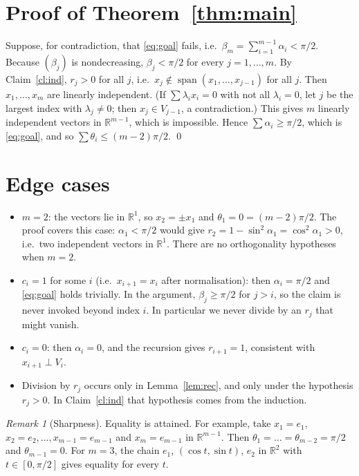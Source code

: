 \documentclass[11pt]{article}
\theoremstyle{remark}
\newtheorem{remark}[theorem]{Remark}
\theoremstyle{definition}
\begin{document}
\section{Proof of Theorem~\ref{thm:main}}

Suppose, for contradiction, that \eqref{eq:goal} fails, i.e.\ $\beta_m=\sum_{i=1}^{m-1}\alpha_i<\pi/2$.
Because $(\beta_j)$ is nondecreasing, $\beta_j<\pi/2$ for every $j=1,\dots,m$. By Claim~\ref{cl:ind},
$r_j>0$ for all $j$, i.e.\ $x_j\notin\operatorname{span}(x_1,\dots,x_{j-1})$ for all $j$. Then
$x_1,\dots,x_m$ are linearly independent. (If $\sum\lambda_ix_i=0$ with not all $\lambda_i=0$, let
$j$ be the largest index with $\lambda_j\ne0$; then $x_j\in V_{j-1}$, a contradiction.) This gives
$m$ linearly independent vectors in $\mathbb{R}^{m-1}$, which is impossible. Hence
$\sum\alpha_i\ge\pi/2$, which is \eqref{eq:goal}, and so $\sum\theta_i\le(m-2)\pi/2$. \qed

\section{Edge cases}

\begin{itemize}
\item $m=2$: the vectors lie in $\mathbb{R}^1$, so $x_2=\pm x_1$ and $\theta_1=0=(m-2)\pi/2$. The proof
  covers this case: $\alpha_1<\pi/2$ would give $r_2=1-\sin^2\alpha_1=\cos^2\alpha_1>0$, i.e.\ two
  independent vectors in $\mathbb{R}^1$. There are no orthogonality hypotheses when $m=2$.
\item $c_i=1$ for some $i$ (i.e.\ $x_{i+1}=x_i$ after normalisation): then $\alpha_i=\pi/2$ and
  \eqref{eq:goal} holds trivially. In the argument, $\beta_j\ge\pi/2$ for $j>i$, so the claim is
  never invoked beyond index $i$. In particular we never divide by an $r_j$ that might vanish.
\item $c_i=0$: then $\alpha_i=0$, and the recursion gives $r_{i+1}=1$, consistent with
  $x_{i+1}\perp V_i$.
\item Division by $r_j$ occurs only in Lemma~\ref{lem:rec}, and only under the hypothesis $r_j>0$.
  In Claim~\ref{cl:ind} that hypothesis comes from the induction.
\end{itemize}

\begin{remark}[Sharpness]
Equality is attained. For example, take $x_1=e_1$, $x_2=e_2,\dots,x_{m-1}=e_{m-1}$ and
$x_m=e_{m-1}$ in $\mathbb{R}^{m-1}$. Then $\theta_1=\dots=\theta_{m-2}=\pi/2$ and $\theta_{m-1}=0$.
For $m=3$, the chain $e_1$, $(\cos t,\sin t)$, $e_2$ in $\mathbb{R}^2$ with $t\in[0,\pi/2]$ gives
equality for every $t$.
\end{remark}
\end{document}

